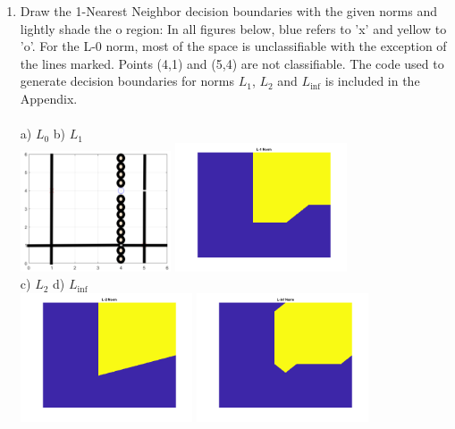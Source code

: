 \documentclass[english]{article}
\begin{document}
\begin{enumerate}
\item 
Draw the 1-Nearest Neighbor decision boundaries with the given norms and lightly shade the o region: In all figures below, blue refers to 'x' and yellow to 'o'. For the L-0 norm, most of the space is unclassifiable with the exception of the lines marked. Points (4,1) and (5,4) are not classifiable. The code used to generate decision boundaries for norms $L_1$, $L_2$ and $L_{\inf}$ is included in the Appendix. \\ \\ a) $L_0$ \qquad \qquad \qquad \qquad \qquad \qquad \qquad \qquad b) $L_1$\\ 
\includegraphics[width=0.35\textwidth]{L_0.png}
\includegraphics[width=0.4\textwidth]{L_1.png} \\
c) $L_2$ \qquad \qquad \qquad \qquad \qquad \qquad \qquad \qquad d) $L_{\inf}$\\
\includegraphics[width=0.4\textwidth]{L_2.png}
\includegraphics[width=0.4\textwidth]{L_inf.png} \\

\end{enumerate}
\end{document}
